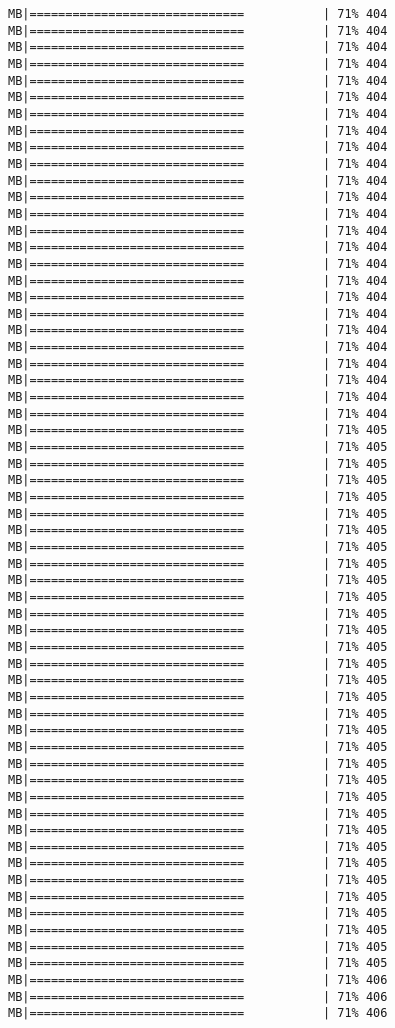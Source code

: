 \documentclass[
]{article}
\begin{document}
\begin{verbatim}
MB|==============================           | 71% 404 MB|==============================           | 71% 404 MB|==============================           | 71% 404 MB|==============================           | 71% 404 MB|==============================           | 71% 404 MB|==============================           | 71% 404 MB|==============================           | 71% 404 MB|==============================           | 71% 404 MB|==============================           | 71% 404 MB|==============================           | 71% 404 MB|==============================           | 71% 404 MB|==============================           | 71% 404 MB|==============================           | 71% 404 MB|==============================           | 71% 404 MB|==============================           | 71% 404 MB|==============================           | 71% 404 MB|==============================           | 71% 404 MB|==============================           | 71% 404 MB|==============================           | 71% 404 MB|==============================           | 71% 404 MB|==============================           | 71% 404 MB|==============================           | 71% 404 MB|==============================           | 71% 404 MB|==============================           | 71% 404 MB|==============================           | 71% 404 MB|==============================           | 71% 405 MB|==============================           | 71% 405 MB|==============================           | 71% 405 MB|==============================           | 71% 405 MB|==============================           | 71% 405 MB|==============================           | 71% 405 MB|==============================           | 71% 405 MB|==============================           | 71% 405 MB|==============================           | 71% 405 MB|==============================           | 71% 405 MB|==============================           | 71% 405 MB|==============================           | 71% 405 MB|==============================           | 71% 405 MB|==============================           | 71% 405 MB|==============================           | 71% 405 MB|==============================           | 71% 405 MB|==============================           | 71% 405 MB|==============================           | 71% 405 MB|==============================           | 71% 405 MB|==============================           | 71% 405 MB|==============================           | 71% 405 MB|==============================           | 71% 405 MB|==============================           | 71% 405 MB|==============================           | 71% 405 MB|==============================           | 71% 405 MB|==============================           | 71% 405 MB|==============================           | 71% 405 MB|==============================           | 71% 405 MB|==============================           | 71% 405 MB|==============================           | 71% 405 MB|==============================           | 71% 405 MB|==============================           | 71% 405 MB|==============================           | 71% 405 MB|==============================           | 71% 406 MB|==============================           | 71% 406 MB|==============================           | 71% 406 
\end{verbatim}
\end{document}
